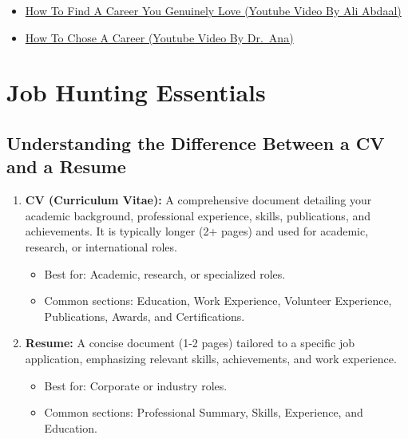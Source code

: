 \documentclass[
  letterpaper,
  DIV=11,
  numbers=noendperiod]{scrreprt}
\providecommand{\tightlist}{%
  \setlength{\itemsep}{0pt}\setlength{\parskip}{0pt}}\usepackage{longtable,booktabs,array}
\begin{document}

\begin{itemize}
\tightlist
\item
  \href{https://www.youtube.com/watch?v=O3m14PVOq_g&pp=ygUfY2FyZWVyIHBsYW5uaW5nIGFuZCBkZXZlbG9wbWVudA\%3D\%3D}{How
  To Find A Career You Genuinely Love (Youtube Video By Ali Abdaal)}
\item
  \href{https://www.youtube.com/watch?v=MNbcaD4YUxI&t=456s&pp=ygUfY2FyZWVyIHBsYW5uaW5nIGFuZCBkZXZlbG9wbWVudA\%3D\%3D}{How
  To Chose A Career (Youtube Video By Dr.~Ana)}
\end{itemize}


\chapter{Job Hunting Essentials}\label{job-hunting-essentials}

\section{Understanding the Difference Between a CV and a
Resume}\label{understanding-the-difference-between-a-cv-and-a-resume}

\begin{enumerate}
\def\labelenumi{\arabic{enumi}.}
\item
  \textbf{CV (Curriculum Vitae):} A comprehensive document detailing
  your academic background, professional experience, skills,
  publications, and achievements. It is typically longer (2+ pages) and
  used for academic, research, or international roles.

  \begin{itemize}
  \tightlist
  \item
    Best for: Academic, research, or specialized roles.
  \item
    Common sections: Education, Work Experience, Volunteer Experience,
    Publications, Awards, and Certifications.
  \end{itemize}
\item
  \textbf{Resume:} A concise document (1-2 pages) tailored to a specific
  job application, emphasizing relevant skills, achievements, and work
  experience.

  \begin{itemize}
  \tightlist
  \item
    Best for: Corporate or industry roles.
  \item
    Common sections: Professional Summary, Skills, Experience, and
    Education.
  \end{itemize}
\end{enumerate}
\end{document}
